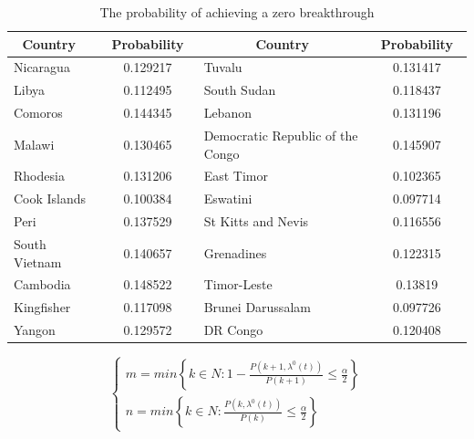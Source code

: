 \documentclass{mcmthesis}
\begin{document}
\begin{table}
\centering
\caption{The probability of achieving a zero breakthrough}
\begin{tabular}{|l|c|l|c|} 
\hline
\multicolumn{1}{|c|}{Country~} & ~Probability~ & \multicolumn{1}{c|}{Country}     & ~Probability~  \\ 
\hline
Nicaragua                      & 0.129217      & Tuvalu                           & 0.131417       \\ 
\hline
Libya                          & 0.112495      & South Sudan                      & 0.118437       \\ 
\hline
Comoros                        & 0.144345      & Lebanon                          & 0.131196       \\ 
\hline
Malawi                         & 0.130465      & Democratic Republic of the Congo & 0.145907       \\ 
\hline
Rhodesia                       & 0.131206      & East Timor                       & 0.102365       \\ 
\hline
Cook Islands                   & 0.100384      & Eswatini                         & 0.097714       \\ 
\hline
Peri                           & 0.137529      & St Kitts and Nevis               & 0.116556       \\ 
\hline
South Vietnam                  & 0.140657      & Grenadines                       & 0.122315       \\ 
\hline
Cambodia                       & 0.148522      & Timor-Leste                      & 0.13819        \\ 
\hline
Kingfisher                     & 0.117098      & Brunei Darussalam                & 0.097726       \\ 
\hline
Yangon                         & 0.129572      & DR Congo                         & 0.120408       \\
\hline
\end{tabular}
\end{table}


\begin{equation}
\left\{\begin{array}{l}
m = min\left\{ k\in N: 1 - \frac{P(k + 1, \lambda ^{0}(t))}{P(k + 1)} \leq \frac{\alpha }{2}\right\}\\n = min\left\{ k\in N: \frac{P(k, \lambda ^{0}(t))}{P(k)} \leq \frac{\alpha }{2}\right\}
\end{array}\right.
\end{equation}
\end{document}
